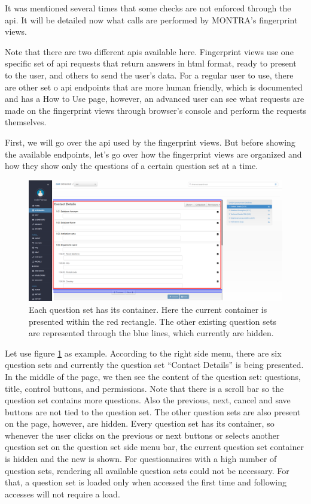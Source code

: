 It was mentioned several times that some checks are not enforced through the \gls{api}.
It will be detailed now what calls are performed by MONTRA's fingerprint views.

Note that there are two different \gls{api}s available here.
Fingerprint views use one specific set of \gls{api} requests that return answers in \gls{html} format, ready to present to the user, and others to send the user's data.
For a regular user to use, there are other set o \gls{api} endpoints that are more human friendly, which is documented and has a How to Use page, however, an advanced user can see what requests are made on the fingerprint views through browser's console and perform the requests themselves.

First, we will go over the \gls{api} used by the fingerprint views.
But before showing the available endpoints, let's go over how the fingerprint views are organized and how they show only the questions of a certain question set at a time.

\begin{figure}[H]
    \center
    \includegraphics[width=\textwidth]{fingerprint-hidden-question-sets}
    \caption{Each question set has its container.
    Here the current container is presented within the red rectangle.
    The other existing question sets are represented through the blue lines, which currently are hidden.}
    \label{fig:fingerprint-hidden-question-sets}
\end{figure}

Let use figure \ref{fig:fingerprint-hidden-question-sets} as example.
According to the right side menu, there are six question sets and currently the question set ``Contact Details'' is being presented.
In the middle of the page, we then see the content of the question set: questions, title, control buttons, and permissions.
Note that there is a scroll bar so the question set contains more questions.
Also the previous, next, cancel and save buttons are not tied to the question set.
The other question sets are also present on the page, however, are hidden.
Every question set has its container, so whenever the user clicks on the previous or next buttons or selects another question set on the question set side menu bar, the current question set container is hidden and the new is shown.
For questionnaires with a high number of question sets, rendering all available question sets could not be necessary.
For that, a question set is loaded only when accessed the first time and following accesses will not require a load.


